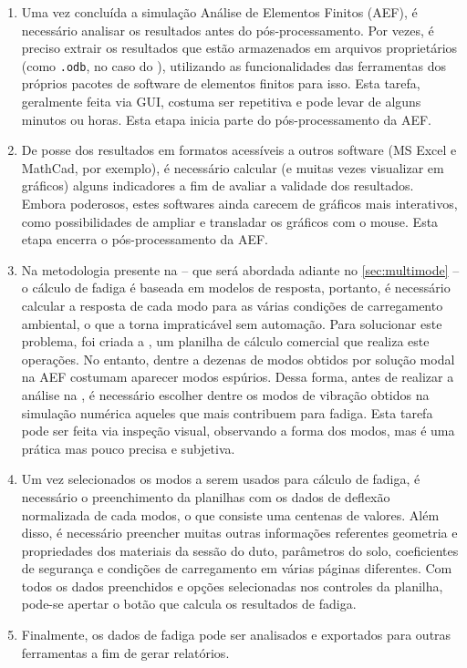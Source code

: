 \begin{enumerate}[label=(\arabic*)]
    \item Uma vez concluída a simulação Análise de Elementos Finitos (AEF), é necessário analisar os resultados antes do pós-processamento. Por vezes, é preciso extrair os resultados que estão armazenados em arquivos proprietários (como \texttt{.odb}, no caso do \abaqus), utilizando as funcionalidades das ferramentas dos próprios pacotes de software de elementos finitos para isso. Esta tarefa, geralmente feita via GUI, costuma ser repetitiva e pode levar de alguns minutos ou horas. Esta etapa inicia parte do pós-processamento da AEF.
    \item De posse dos resultados em formatos acessíveis a outros software (MS Excel e MathCad, por exemplo), é necessário calcular (e muitas vezes visualizar em gráficos) alguns indicadores a fim de avaliar a validade dos resultados. Embora poderosos, estes softwares ainda carecem de gráficos mais interativos, como possibilidades de ampliar e transladar os gráficos com o mouse. Esta etapa encerra o pós-processamento da AEF.
    \item Na metodologia presente na  -- que será abordada adiante no \autoref{sec:multimode} -- o cálculo de fadiga é baseada em modelos de resposta, portanto, é necessário calcular a resposta de cada modo para as várias condições de carregamento ambiental, o que a torna impraticável sem automação. Para solucionar este problema, foi criada a \fatfree, um planilha de cálculo comercial que realiza este operações. No entanto, dentre a dezenas de modos obtidos por solução modal na AEF costumam aparecer modos espúrios. Dessa forma, antes de realizar a análise na \fatfree, é necessário escolher dentre os modos de vibração obtidos na simulação numérica aqueles que mais contribuem para fadiga. Esta tarefa pode ser feita via inspeção visual, observando a forma dos modos, mas é uma prática mas pouco precisa e subjetiva.
    \item Um vez selecionados os modos a serem usados para cálculo de fadiga, é necessário o preenchimento da planilhas com os dados de deflexão normalizada de cada modos, o que consiste uma centenas de valores. Além disso, é necessário preencher muitas outras informações referentes geometria e propriedades dos materiais da sessão do duto, parâmetros do solo, coeficientes de segurança e condições de carregamento em várias páginas diferentes. Com todos os dados preenchidos e opções selecionadas nos controles da planilha, pode-se apertar o botão que calcula os resultados de fadiga.
    \item Finalmente, os dados de fadiga pode ser analisados e exportados para outras ferramentas a fim de gerar relatórios.
\end{enumerate}